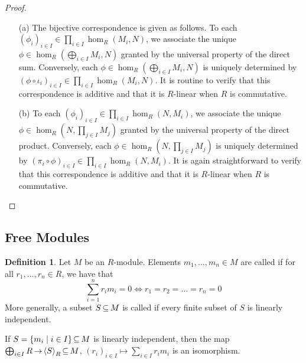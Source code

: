 \documentclass[11pt]{book}
\theoremstyle{definition}   \newtheorem{defn}[counter]{Definition} %
\newtheorem*{defn*}{Definition}
\newcommand{\gen}[1]{\left\langle #1 \right\rangle}   \newcommand{\stab}[2]{\tn{Stab}_{#1}(#2)}   \newcommand{\fix}[2]{\tn{Fix}_{#1}(#2)}   \newcommand{\op}{^{\tn{op}}}
\DeclareMathOperator{\ra}{\rightarrow}   \DeclareMathOperator{\Poly}{\mathbf{P}}   \DeclareMathOperator{\spn}{\textnormal{span}}   \DeclareMathOperator{\aut}{\textnormal{Aut}}
\newcommand{\vs}{\vspace{8pt}}
\numberwithin{counter}{chapter}
\begin{document}
\begin{proof}\ 
\begin{enumerate}
\item[(a)] The bijective correspondence is given as follows. To each $(\phi_i)_{i \in I} \in \prod_{i \in I} \hom_R(M_i,N)$, we associate the unique $\phi \in \hom_R(\bigoplus_{i \in I} M_i,N)$ granted by the universal property of the direct sum. Conversely, each $\phi \in \hom_R(\bigoplus_{i \in I} M_i,N)$ is uniquely determined by $(\phi \circ \iota_i)_{i \in I} \in \prod_{i \in I} \hom_R(M_i,N)$. It is routine to verify that this correspondence is additive and that it is $R$-linear when $R$ is commutative.

\item[(b)] To each $(\phi_i)_{i \in I} \in \prod_{i \in I} \hom_R(N,M_i)$, we associate the unique $\phi \in \hom_R(N,\prod_{j \in I} M_j)$ granted by the universal property of the direct product. Conversely, each $\phi \in  \hom_R(N,\prod_{j \in I} M_j)$ is uniquely determined by $(\pi_i \circ \phi)_{i \in I} \in \prod_{i \in I} \hom_R(N,M_i)$. It is again straightforward to verify that this correspondence is additive and that it is $R$-linear when $R$ is commutative. 
\end{enumerate}
\end{proof}

\vs

\subsection*{Free Modules}

\vs

\begin{defn*}
Let $M$ be an $R$-module. Elements $m_1,\dots,m_n \in M$ are called  if for all $r_1,\dots,r_n \in R$, we have that 
	\[\sum_{i = 1}^n r_i m_i = 0 \iff r_1 = r_2 = \dots = r_n = 0 \]
More generally, a subset $S \operatorname{\subseteq} M$ is called  if every finite subset of $S$ is linearly independent. 
\end{defn*}

\vs

\begin{remark}
If $S = \{m_i \mid i \in I\} \operatorname{\subseteq} M$ is linearly independent, then the map $\bigoplus_{i \in I} R \ra \gen{S}_R \sub M$, $(r_i)_{i \in I} \mapsto \sum_{i \in I} r_i m_i$ is an isomorphism. 
\end{remark}

\vs
\end{document}
